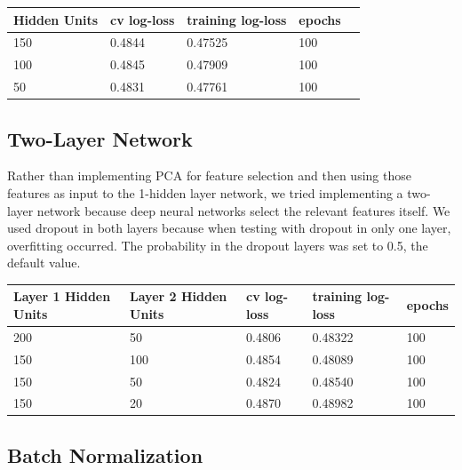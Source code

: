 \documentclass[twoside,11pt]{article}
\theoremstyle{definition}
\begin{document}
      \begin{center}
          \begin{tabular}{ | l | l | l | l | p{5cm} |}
          \hline
          Hidden Units & cv log-loss & training log-loss & epochs \\ \hline
          150 & 0.4844 & 0.47525 & 100 \\ \hline
          100 & 0.4845 & 0.47909 & 100 \\ \hline
          50 & 0.4831 & 0.47761 & 100 \\ \hline 
          \end{tabular}
      \end{center}

\subsection{Two-Layer Network}
Rather than implementing PCA for feature selection and then using those features as input to the 1-hidden layer network, we tried implementing a two-layer network because deep neural networks select the relevant features itself. We used dropout in both layers because when testing with dropout in only one layer, overfitting occurred. The probability in the dropout layers was set to 0.5, the default value. 

      \begin{center}
          \begin{tabular}{ | l | l | l | l | p{5cm} |}
          \hline
          Layer 1 Hidden Units & Layer 2 Hidden Units & cv log-loss & training log-loss & epochs \\ \hline
          200 & 50 & 0.4806 & 0.48322 & 100 \\ \hline
          150 & 100 & 0.4854 & 0.48089 & 100 \\ \hline
          150 & 50 & 0.4824 & 0.48540 & 100 \\ \hline
          150 & 20 & 0.4870 & 0.48982 & 100 \\ \hline
          \end{tabular}
      \end{center}

\subsection{Batch Normalization}
\end{document}
